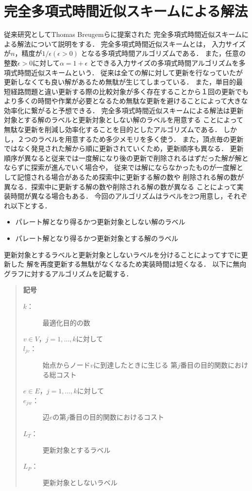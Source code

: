 \documentclass[12pt]{optlab-bachelor}
\begin{document}
\section{完全多項式時間近似スキームによる解法}
従来研究としてThomas Breugemら\cite{Breugem}に提案された
完全多項式時間近似スキームによる解法について説明をする．
完全多項式時間近似スキームとは，
入力サイズが$n$，精度が$1 / \epsilon(\epsilon > 0)$
となる多項式時間アルゴリズムである．
また，任意の整数$\epsilon > 0$に対して$\alpha = 1+\epsilon$
とできる入力サイズの多項式時間アルゴリズムを多項式時間近似スキームという．
従来は全ての解に対して更新を行なっていたが更新しなくても良い解があるため無駄が生じてしまっている．
また，単目的最短経路問題と違い更新する際の比較対象が多く存在することから１回の更新でも
より多くの時間や作業が必要となるため無駄な更新を避けることによって大きな効率化に繋がると予想できる．
完全多項式時間近似スキームによる解法は更新対象とする解のラベルと更新対象としない解のラベルを用意する
ことによって無駄な更新を削減し効率化することを目的としたアルゴリズムである．
しかし，２つのラベルを用意するため多少メモリを多く使う．
また，頂点毎の更新ではなく発見された解から順に更新されていくため，更新順序も異なる．
更新順序が異なると従来では一度解になり後の更新で削除されるはずだった解が解とならずに探索が進んでいく場合や，
従来では解にならなかったものが一度解として記憶される場合があるため探索中に更新する解の数や
削除される解の数が異なる．探索中に更新する解の数や削除される解の数が異なる
ことによって実装時間が異なる場合もある．
今回のアルゴリズムはラベルを2つ用意し，それぞれ以下とする．
\begin{itemize}
\item パレート解となり得るかつ更新対象としない解のラベル
\item パレート解となり得るかつ更新対象とする解のラベル
\end{itemize}
更新対象とするラベルと更新対象としないラベルを分けることによってすでに更新した
解を再度更新する無駄がなくなるため実装時間は短くなる．
以下に無向グラフに対するアルゴリズムを記載する．

\begin{quote}
  \textbf{記号}
  \begin{description}
    \item[$k$：] 最適化目的の数
    \item[$v \in V$，$j = 1 , \ldots , k$に対して]
    \item[$l_{jv}$：] 始点からノード$v$に到達したときに生じる
    第$j$番目の目的関数における総コスト
    \item[$e \in E$，$j = 1 , \ldots , k$に対して]
    \item[$e_{jw}$：] 辺$e$の第$j$番目の目的関数におけるコスト
    \item[$L_T$：] 更新対象とするラベル
    \item[$L_P$：] 更新対象としないラベル
  \end{description}
\end{quote}
\end{document}
